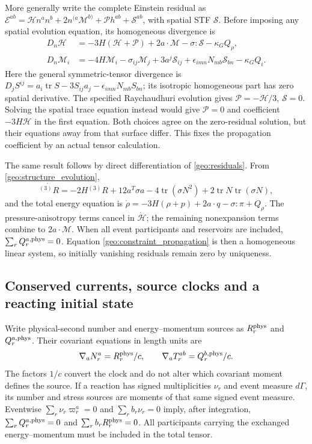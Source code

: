 More generally write the complete Einstein residual as
$\mathscr E^{ab}=\mathscr Hn^an^b+2n^{(a}\mathscr M^{b)}+\mathscr P h^{ab}+\mathscr S^{ab}$, with spatial STF $\mathscr S$. Before imposing any spatial evolution equation, its homogeneous divergence is
\begin{align}
 D_n\mathscr H&=-3H(\mathscr H+\mathscr P)+2a\cdot\mathscr M
                         -\sigma:\mathscr S-\kappa_GQ_\rho,\nonumber\\
 D_n\mathscr M_i&=-4H\mathscr M_i-\sigma_{ij}\mathscr M_j
 +3a^j\mathscr S_{ij}+\epsilon_{imn}N_{mb}\mathscr S_{bn}-\kappa_GQ_i.
 \label{geo:general_residual}
\end{align}
Here the general symmetric-tensor divergence is
$D_jS^{ij}=a_i\operatorname{tr}S-3S_{ij}a_j-\epsilon_{imn}N_{mb}S_{bn}$; its isotropic homogeneous part has zero spatial derivative. The specified Raychaudhuri evolution gives $\mathscr P=-\mathscr H/3$, $\mathscr S=0$. Solving the spatial trace equation instead would give $\mathscr P=0$ and coefficient $-3H\mathscr H$ in the first equation. Both choices agree on the zero-residual solution, but their equations away from that surface differ. This fixes the propagation coefficient by an actual tensor calculation.

The same result follows by direct differentiation of \eqref{geo:residuals}. From \eqref{geo:structure_evolution},
\begin{equation}
 \dot{{}^{(3)}R}=-2H{}^{(3)}R+12a^T\sigma a
 -4\operatorname{tr}(\sigma N^2)
 +2\operatorname{tr}N\operatorname{tr}(\sigma N),
 \label{geo:curvature_derivative}
\end{equation}
and the total energy equation is
$\dot\rho=-3H(\rho+p)+2a\cdot q-\sigma:\pi+Q_\rho$.
The pressure-anisotropy terms cancel in $\dot{\mathscr H}$; the remaining nonexpansion terms combine to $2a\cdot\mathscr M$. When all event participants and reservoirs are included, $\sum_rQ_r^{a,\rm phys}=0$. Equation \eqref{geo:constraint_propagation} is then a homogeneous linear system, so initially vanishing residuals remain zero by uniqueness.


\subsection{Conserved currents, source clocks and a reacting initial state}
\label{geo:reacting_initial}
Write physical-second number and energy--momentum sources as $R_r^{\rm phys}$ and $Q_r^{a,\rm phys}$. Their covariant equations in length units are
\begin{equation}
 \nabla_aN_r^a=R_r^{\rm phys}/c,\qquad
 \nabla_aT_r^{ab}=Q_r^{b,\rm phys}/c.
 \label{geo:source_clocks}
\end{equation}
The factors $1/c$ convert the clock and do not alter which covariant moment defines the source. If a reaction has signed multiplicities $\nu_r$ and event measure $d\Gamma$, its number and stress sources are moments of that same signed event measure. Eventwise $\sum_r\nu_r\varpi_r^a=0$ and $\sum_r b_r\nu_r=0$ imply, after integration, $\sum_rQ_r^{a,\rm phys}=0$ and $\sum_rb_rR_r^{\rm phys}=0$. All participants carrying the exchanged energy--momentum must be included in the total tensor.

